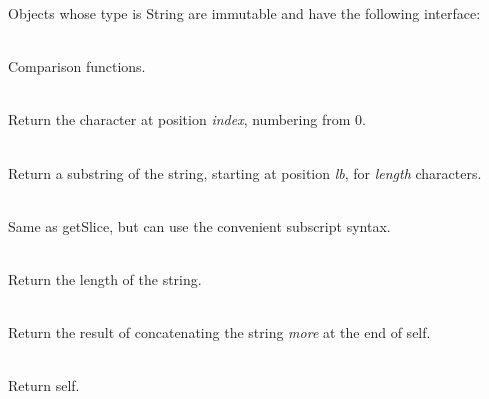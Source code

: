 \noindent Objects whose type is String are immutable and have the following
interface:

\begin{desc}
  \item[\kw{function} \opd{$>$} \/\LB{}\tn{String}\/\RB{} \returns{} \/\LB{}\tn{Boolean}\/\RB{}]
  \item[\kw{function} \opd{$>=$} \/\LB{}\tn{String}\/\RB{} \returns{} \/\LB{}\tn{Boolean}\/\RB{}]
  \item[\kw{function} \opd{$<$} \/\LB{}\tn{String}\/\RB{} \returns{} \/\LB{}\tn{Boolean}\/\RB{}]
  \item[\kw{function} \opd{$<=$} \/\LB{}\tn{String}\/\RB{} \returns{} \/\LB{}\tn{Boolean}\/\RB{}]
  \item[\kw{function} \opd{$=$} \/\LB{}\tn{String}\/\RB{} \returns{} \/\LB{}\tn{Boolean}\/\RB{}]
  \item[\kw{function} \opd{$!=$} \/\LB{}\tn{String}\/\RB{} \returns{} \/\LB{}\tn{Boolean}\/\RB{}]~\\
    Comparison functions.
  \item[\kw{function} getElement\/\LB{}index \CO{} \tn{Integer}\/\RB{} \returns{} \/\LB{}\tn{Character}\/\RB{}]~\\
    Return the character at position {\it index}, numbering from 0.
  \item[\kw{function} getSlice\/\LB{}lb \CO{} \tn{Integer}, length \CO{} \tn{Integer}\/\RB{} \returns{} \/\LB{}\tn{String}\/\RB{}]~\\
    Return a substring of the string, starting at position {\it lb}, for
    {\it length} characters.
  \item[\kw{function} getElement\/\LB{}lb \CO{} \tn{Integer}, length \CO{} \tn{Integer}\/\RB{} \returns{} \/\LB{}\tn{String}\/\RB{}]~\\
    Same as getSlice, but can use the convenient subscript syntax.
  \item[\kw{function} length \returns{} \/\LB{}\tn{Integer}\/\RB{}]~\\
    Return the length of the string.
  \item[\kw{function} \opd{$|$$|$} \/\LB{}more \CO{} \tn{String}\/\RB{} \returns{} \/\LB{}\tn{String}\/\RB{}]~\\
    Return the result of concatenating the string {\it more} at the end of
    self.
  \item[\kw{function} asString \returns{} \/\LB{}\tn{String}\/\RB{}]~\\
    Return self.
  \item[\kw{function} lowerbound \returns{} \/\LB{}\tn{Integer}\/\RB{}]~\\

\end{desc}
